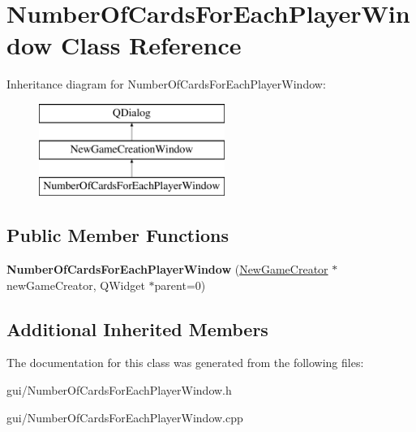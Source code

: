 \hypertarget{classNumberOfCardsForEachPlayerWindow}{}\section{Number\+Of\+Cards\+For\+Each\+Player\+Window Class Reference}
\label{classNumberOfCardsForEachPlayerWindow}
Inheritance diagram for Number\+Of\+Cards\+For\+Each\+Player\+Window\+:\begin{figure}[H]
\begin{center}
\leavevmode
\includegraphics[height=3.000000cm]{classNumberOfCardsForEachPlayerWindow}
\end{center}
\end{figure}
\subsection*{Public Member Functions}
\begin{DoxyCompactItemize}
\item 
\mbox{\label{classNumberOfCardsForEachPlayerWindow_aadd6710e807d6ac5a401c1ecbe51792b}} 
{\bfseries Number\+Of\+Cards\+For\+Each\+Player\+Window} (\hyperlink{classNewGameCreator}{New\+Game\+Creator} $\ast$new\+Game\+Creator, Q\+Widget $\ast$parent=0)
\end{DoxyCompactItemize}
\subsection*{Additional Inherited Members}


The documentation for this class was generated from the following files\+:\begin{DoxyCompactItemize}
\item 
gui/Number\+Of\+Cards\+For\+Each\+Player\+Window.\+h\item 
gui/Number\+Of\+Cards\+For\+Each\+Player\+Window.\+cpp\end{DoxyCompactItemize}
